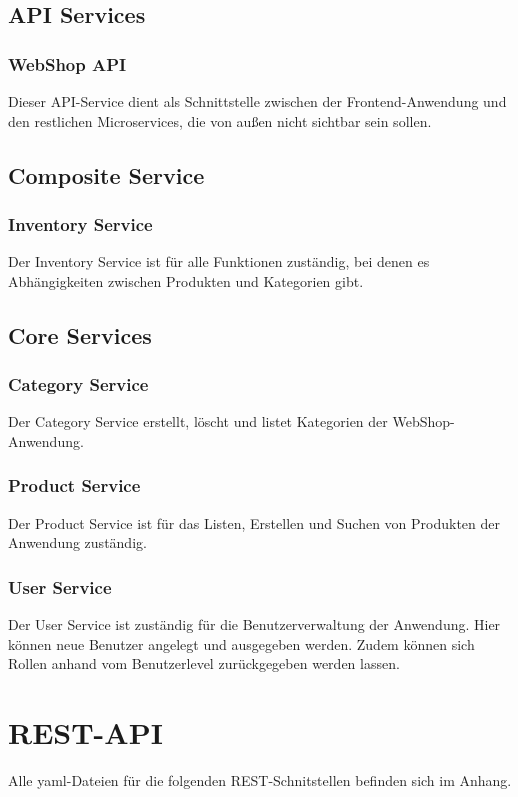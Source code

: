 \documentclass[12pt,a4paper]{article}
\begin{document}
		\subsection{API Services}
			\subsubsection{WebShop API}
			Dieser API-Service dient als Schnittstelle zwischen der Frontend-Anwendung und den restlichen Microservices, die von außen nicht sichtbar sein sollen.
			
		\subsection{Composite Service}
			\subsubsection{Inventory Service}
			Der Inventory Service ist für alle Funktionen zuständig, bei denen es Abhängigkeiten zwischen Produkten und Kategorien gibt.
		
		\subsection{Core Services}
			\subsubsection{Category Service}
			Der Category Service erstellt, löscht und listet Kategorien der WebShop-Anwendung.
			
			\subsubsection{Product Service}
			Der Product Service ist für das Listen, Erstellen und Suchen von Produkten der Anwendung zuständig.
			
			\subsubsection{User Service}
			Der User Service ist zuständig für die Benutzerverwaltung der Anwendung. Hier können neue Benutzer angelegt und ausgegeben werden. Zudem können sich Rollen anhand vom Benutzerlevel zurückgegeben werden lassen.
			
	\newpage
	\section{REST-API}
	\label{sec:REST-API}
	Alle yaml-Dateien für die folgenden REST-Schnitstellen befinden sich im Anhang.
	
\end{document}
